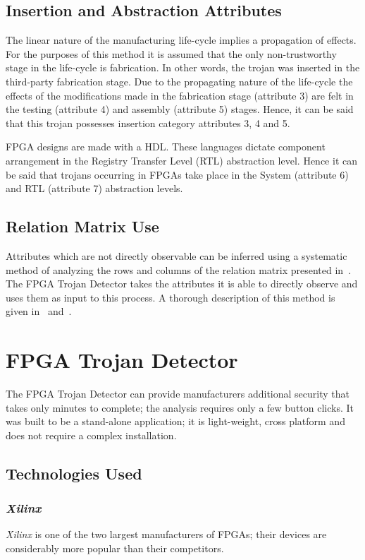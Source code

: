 \documentclass[journal, hidelinks]{IEEEtran}
\begin{document}
\subsection{Insertion and Abstraction Attributes}
The linear nature of the manufacturing life-cycle implies a propagation of effects.
For the purposes of this method it is assumed that the only non-trustworthy stage in the life-cycle is fabrication.
In other words, the trojan was inserted in the third-party fabrication stage.
Due to the propagating nature of the life-cycle the effects of the modifications made in the fabrication stage (attribute 3) are felt in the testing (attribute 4) and assembly (attribute 5) stages.
Hence, it can be said that this trojan possesses insertion category attributes 3, 4 and 5.

FPGA designs are made with a HDL.
These languages dictate component arrangement in the Registry Transfer Level (RTL) abstraction level.
Hence it can be said that trojans occurring in FPGAs take place in the System (attribute 6) and RTL (attribute 7) abstraction levels.

\subsection{Relation Matrix Use} \label{sec:matrixUse}
Attributes which are not directly observable can be inferred using a systematic method of analyzing the rows and columns of the relation matrix presented in~\cite{samerAttribute}.
The FPGA Trojan Detector takes the attributes it is able to directly observe and uses them as input to this process.
A thorough description of this method is given in~\cite{samerDissertation} and~\cite{meCategorization}.

\section{FPGA Trojan Detector} \label{sec:implementation}
The FPGA Trojan Detector can provide manufacturers additional security that takes only minutes to complete; the analysis requires only a few button clicks.
It was built to be a stand-alone application; it is light-weight, cross platform and does not require a complex installation.
\subsection{Technologies Used}
\subsubsection{\textit{Xilinx}}
\textit{Xilinx} is one of the two largest manufacturers of FPGAs; their devices are considerably more popular than their competitors.
\end{document}
